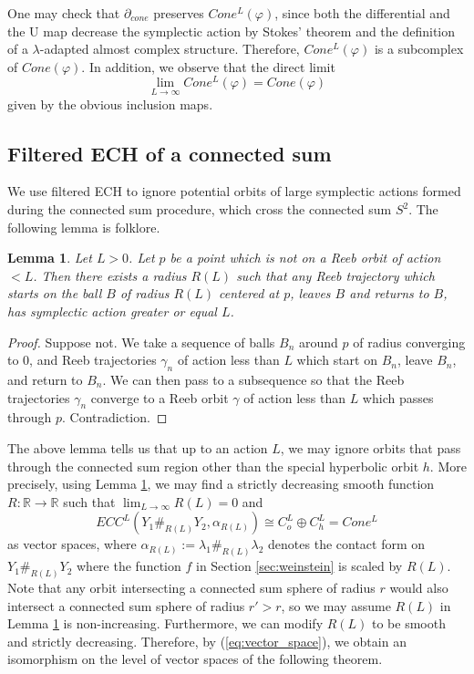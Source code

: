 \documentclass{article}
\numberwithin{equation}{section}
\newtheorem{lemma}[theorem]{Lemma}
\theoremstyle{definition}
\newcommand{\R}{\mathbb{R}}
\begin{document}
One may check that $\partial_{cone}$ preserves $Cone^L(\varphi)$, since both the differential and the U map decrease the symplectic action by Stokes' theorem and the definition of a $\lambda$-adapted almost complex structure. Therefore, $Cone^L(\varphi)$ is a subcomplex of $Cone(\varphi)$. In addition, we observe that the direct limit
$$\lim_{L\to\infty}Cone^L(\varphi) = Cone(\varphi)$$
given by the obvious inclusion maps.





\subsection{Filtered ECH of a connected sum}
\label{sec:filtered_ech_of_a_connected_sum}
We use filtered ECH to ignore potential orbits of large symplectic actions formed during the connected sum procedure, which cross the connected sum $S^2$. The following lemma is folklore.


\begin{lemma}
\label{lem:large_energy}
Let $L>0$. Let $p$ be a point which is not on a Reeb orbit of action $< L$. Then there exists a radius $R(L)$ such that any Reeb trajectory which starts on the ball $B$ of radius $R(L)$ centered at $p$, leaves $B$ and returns to $B$, has symplectic action greater or equal $L$.
\end{lemma}

\begin{proof}
Suppose not. We take a sequence of balls $B_n$ around $p$ of radius converging to $0$, and Reeb trajectories $\gamma_n$ of action less than $L$ which start on $B_n$, leave $B_n$, and return to $B_n$. We can then pass to a subsequence so that the Reeb trajectories $\gamma_n$ converge to a Reeb orbit $\gamma$ of action less than $L$ which passes through $p$. Contradiction.
\end{proof}

The above lemma tells us that up to an action $L$, we may ignore orbits that pass through the connected sum region other than the special hyperbolic orbit $h$. More precisely, using Lemma \ref{lem:large_energy}, we may find a strictly decreasing smooth function $R: \R \to \R$ such that $\lim_{L\to \infty} R(L) = 0$ and 
\begin{equation}
\label{eq:vector_space}
    ECC^L(Y_1 \#_{R(L)} Y_2, \alpha_{R(L)}) \cong C_o^L \oplus C_h^L= Cone^L
\end{equation}
as vector spaces, where $\alpha_{R(L)} := \lambda_1 \#_{R(L)} \lambda_2$ denotes the contact form on $Y_1 \#_{R(L)} Y_2$ where the function $f$ in Section \ref{sec:weinstein} is scaled by $R(L)$. Note that any orbit intersecting a connected sum sphere of radius $r$ would also intersect a connected sum sphere of radius $r'>r$, so we may assume $R(L)$ in Lemma \ref{lem:large_energy} is non-increasing. Furthermore, we can modify $R(L)$ to be smooth and strictly decreasing. Therefore, by (\ref{eq:vector_space}), we obtain an isomorphism on the level of vector spaces of the following theorem.
\end{document}

